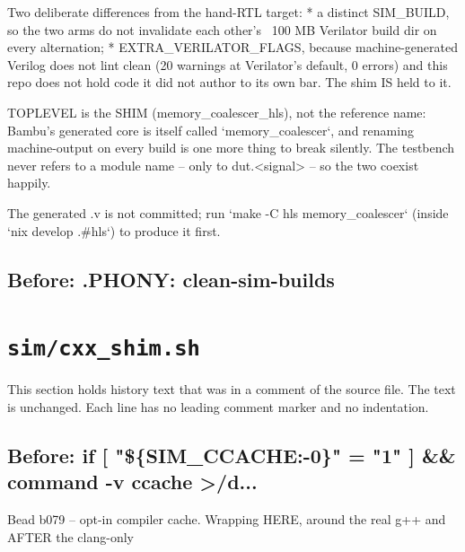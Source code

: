 \begin{record}
\begin{textblock}
Two deliberate differences from the hand-RTL target:
  * a distinct SIM_BUILD, so the two arms do not invalidate each other's
    ~100 MB Verilator build dir on every alternation;
  * EXTRA_VERILATOR_FLAGS, because machine-generated Verilog does not lint
    clean (20 warnings at Verilator's default, 0 errors) and this repo does not
    hold code it did not author to its own bar. The shim IS held to it.

TOPLEVEL is the SHIM (memory_coalescer_hls), not the reference name: Bambu's
generated core is itself called `memory_coalescer`, and renaming machine-output
on every build is one more thing to break silently. The testbench never refers
to a module name -- only to dut.<signal> -- so the two coexist happily.

The generated .v is not committed; run `make -C hls memory_coalescer` (inside
`nix develop .#hls`) to produce it first.
\end{textblock}

\subsection*{Before: .PHONY: clean-sim-builds}


\end{record}

\section{\texttt{sim/cxx\_shim.sh}}\label{cr:suite:sim-cxx-shim-sh}

This section holds history text that was in a comment of the source file. The text is unchanged. Each line has no leading comment marker and no indentation.

\begin{record}

\subsection*{Before: if [ "\$\{SIM\_CCACHE:-0\}" = "1" ] \&\& command -v ccache >/d...}

\begin{textblock}
Bead b079 -- opt-in compiler cache.  Wrapping HERE, around the real g++ and AFTER the clang-only
\end{textblock}

\end{record}

